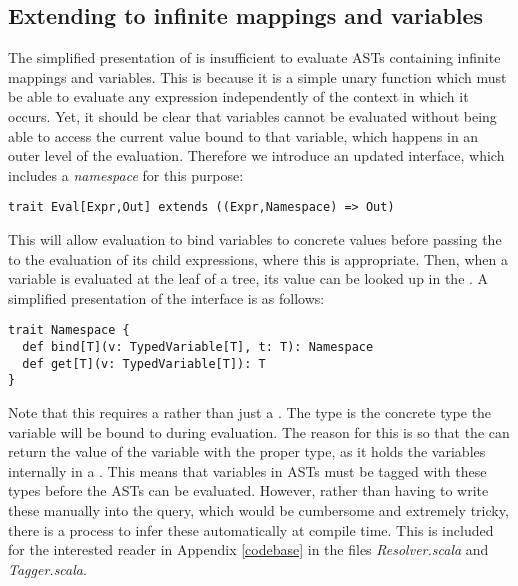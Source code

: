 \subsection{Extending to infinite mappings and variables}
The simplified presentation of  is insufficient to evaluate ASTs containing infinite mappings and variables. This is because it is a simple unary function which must be able to evaluate any expression independently of the context in which it occurs. Yet, it should be clear that variables cannot be evaluated without being able to access the current value bound to that variable, which happens in an outer level of the evaluation.
Therefore we introduce an updated interface, which includes a \textit{namespace} for this purpose:
\vs\begin{lstlisting}
trait Eval[Expr,Out] extends ((Expr,Namespace) => Out)
\end{lstlisting}\vs
This will allow evaluation to bind variables to concrete values before passing the  to the evaluation of its child expressions, where this is appropriate. Then, when a variable is evaluated at the leaf of a tree, its value can be looked up in the . A simplified presentation of the  interface is as follows:
\vs\begin{lstlisting}
trait Namespace {
  def bind[T](v: TypedVariable[T], t: T): Namespace
  def get[T](v: TypedVariable[T]): T
}
\end{lstlisting}\vs
Note that this requires a  rather than just a . The type  is the concrete type the variable will be bound to during evaluation. The reason for this is so that the  can return the value of the variable with the proper type, as it holds the variables internally in a . This means that variables in ASTs must be tagged with these types before the ASTs can be evaluated. However, rather than having to write these manually into the query, which would be cumbersome and extremely tricky, there is a process to infer these automatically at compile time. This is included for the interested reader in Appendix \ref{codebase} in the files \textit{Resolver.scala} and \textit{Tagger.scala}.

